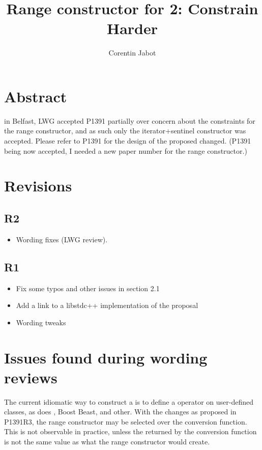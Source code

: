 \documentclass{wg21}
\title{Range constructor for \tcode{std::string\_view} 2: Constrain Harder}
\author{Corentin Jabot}{corentin.jabot@gmail.com}
\begin{document}
\maketitle

\section{Abstract}

in Belfast, LWG accepted P1391 partially over concern about the constraints for the range constructor, and as such only the iterator+sentinel
constructor was accepted. Please refer to P1391 for the design of the proposed changed.
(P1391 being now accepted, I needed a new paper number for the range constructor.)


\section{Revisions}

\subsection{R2}
\begin{itemize}
    \item Wording fixes (LWG review).
\end{itemize}


\subsection{R1}
\begin{itemize}
    \item Fix some typos and other issues in section 2.1
    \item Add a link to a libstdc++ implementation of the proposal
    \item Wording tweaks
\end{itemize}


\section{Issues found during wording reviews}

The current idiomatic way to construct a  is to define a  operator on user-defined classes, 
as does ,  Boost Beast,  and other.
With the changes as proposed in P1391R3, the range constructor may be selected over the conversion function.
This is not observable in practice, unless the  returned by the conversion function is not the same value as what the range constructor would create.
\end{document}
